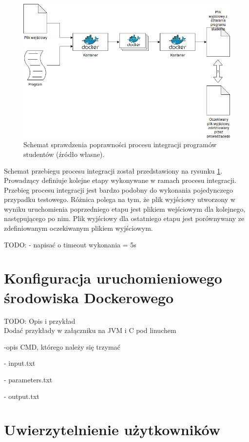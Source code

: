 \begin{figure}[h]
    \centering
    \includegraphics[width = 13cm]{chapter02/integration.png}
    \caption{Schemat sprawdzenia poprawności procesu integracji programów studentów (źródło własne).}
    \label{fig:integration}
\end{figure}

Schemat przebiegu procesu integracji został przedstawiony na rysunku \ref{fig:integration}.
Prowadzący definiuje kolejne etapy wykonywane w ramach procesu integracji.
Przebieg procesu integracji jest bardzo podobny do wykonania pojedynczego przypadku testowego.
Różnica polega na tym, że plik wyjściowy utworzony w wyniku uruchomienia poprzedniego etapu jest plikiem wejściowym dla kolejnego, następującego po nim.
Plik wyjściowy dla ostatniego etapu jest porównywany ze zdefiniowanym oczekiwanym plikiem wyjściowym.

TODO:
- napisać o timeout wykonania = 5s

\vfill

\section {Konfiguracja uruchomieniowego środowiska Dockerowego}

TODO: Opis i przykład
\\ Dodać przykłady w załączniku na JVM i C pod linuchem

-opis CMD, którego należy się trzymać

- input.txt

- parameters.txt

- output.txt

\section {Uwierzytelnienie użytkowników}
\label{authorization}

